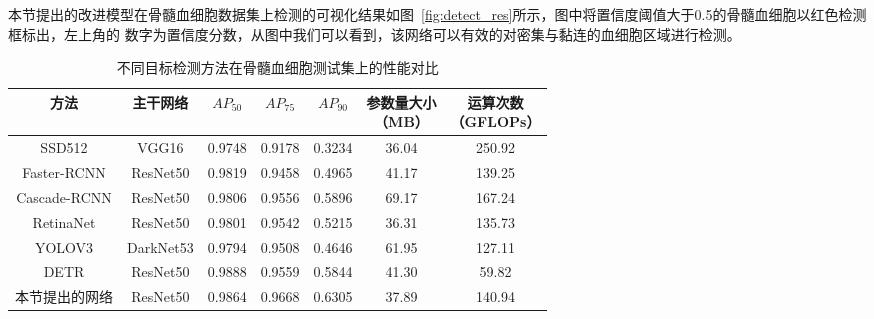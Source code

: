 本节提出的改进模型在骨髓血细胞数据集上检测的可视化结果如图~\ref{fig:detect_res}所示，图中将置信度阈值大于0.5的骨髓血细胞以红色检测框标出，左上角的
数字为置信度分数，从图中我们可以看到，该网络可以有效的对密集与黏连的血细胞区域进行检测。
\begin{table}[htb]
  \caption{不同目标检测方法在骨髓血细胞测试集上的性能对比}   
  \centering 
  \label{table:cell_det_con}
  \begin{tabular*}{0.90\hsize}{@{}@{\extracolsep{\fill}}ccccccc@{}}
    \toprule[1pt]
    方法 & 主干网络  &  $AP_{50}$ & $AP_{75}$ & $AP_{90}$ & \makecell{参数量大小\\（MB）} & \makecell{运算次数 \\（GFLOPs）} \\
    \midrule[1pt] 
    SSD512      & VGG16    & 0.9748 & 0.9178 & 0.3234 &  36.04 & 250.92 \\
    Faster-RCNN & ResNet50 & 0.9819 & 0.9458 & 0.4965 &  41.17 & 139.25 \\ 
    Cascade-RCNN & ResNet50 & 0.9806& 0.9556 & 0.5896 & 69.17 & 167.24   \\ 
    RetinaNet   & ResNet50 & 0.9801 & 0.9542 & 0.5215 &  36.31 & 135.73  \\ 
    YOLOV3      & DarkNet53 & 0.9794 & 0.9508 & 0.4646 & 61.95 & 127.11  \\ 
    DETR        & ResNet50 & 0.9888 &  0.9559 & 0.5844 &  41.30 & 59.82  \\ 
    \hline
    本节提出的网络 & ResNet50 & 0.9864 & 0.9668 &  0.6305 & 37.89 & 140.94\\
    \bottomrule[1pt]      
  \end{tabular*} 
\end{table}
